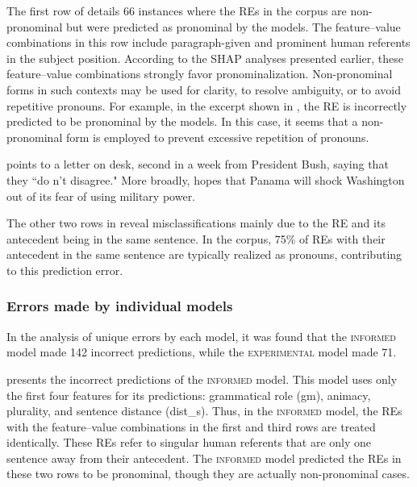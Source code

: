{\renewcommand\normalsize{\footnotesize}%
	\normalsize
	}


The first row of  details 66 instances where the REs in the corpus are non-pronominal but were predicted as pronominal by the models. The feature--value combinations in this row include paragraph-given and prominent human referents in the subject position. According to the SHAP analyses presented earlier, these feature--value combinations strongly favor pronominalization. Non-pronominal forms in such contexts may be used for clarity, to resolve ambiguity, or to avoid repetitive pronouns. For example, in the \wsj excerpt shown in , the RE  is incorrectly predicted to be pronominal by the models. In this case, it seems that a non-pronominal form is employed to prevent excessive repetition of pronouns.

\begin{exe}
	\ex \example{wsj-0771}
	\begin{xlist}
		\ex {} points to a letter on  desk,  second in a week from President Bush, saying that they ``do n't disagree." More broadly,  hopes that Panama will shock Washington out of its fear of using military power. \label{ex:mrboren}
	\end{xlist} 
\end{exe}


The other two rows in  reveal misclassifications mainly due to the RE and its antecedent being in the same sentence. In the \wsj corpus, 75\% of REs with their antecedent in the same sentence are typically realized as pronouns, contributing to this prediction error.


\subsubsection{Errors made by individual models}\label{subsubsec:oneModelErrors}

In the analysis of unique errors by each model, it was found that the \textsc{informed} model made 142 incorrect predictions, while the \textsc{experimental} model made 71.


 presents the incorrect predictions of the \textsc{informed} model. This model uses only the first four features for its predictions: grammatical role (gm), animacy, plurality, and sentence distance (dist\_s). Thus, in the \textsc{informed} model, the REs with the feature--value combinations in the first and third rows are treated identically. These REs refer to singular human referents that are only one sentence away from their antecedent. The \textsc{informed} model predicted the REs in these two rows to be pronominal, though they are actually non-pronominal cases.


